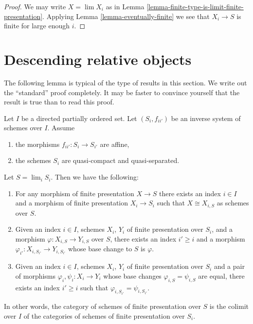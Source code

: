 \begin{proof}
We may write $X = \lim X_i$ as in
Lemma \ref{lemma-finite-type-is-limit-finite-presentation}.
Applying Lemma \ref{lemma-eventually-finite} we see that $X_i \to S$
is finite for large enough $i$.
\end{proof}








\section{Descending relative objects}
\label{section-descending-relative}

\noindent
The following lemma is typical of the type of results in this section.
We write out the ``standard'' proof completely. It may be faster to
convince yourself that the result is true than to read this proof.

\begin{lemma}
\label{lemma-descend-finite-presentation}
Let $I$ be a directed partially ordered set.
Let $(S_i, f_{ii'})$ be an inverse system of schemes over $I$.
Assume
\begin{enumerate}
\item the morphisms $f_{ii'} : S_i \to S_{i'}$ are affine,
\item the schemes $S_i$ are quasi-compact and quasi-separated.
\end{enumerate}
Let $S = \lim_i S_i$. Then we have the following:
\begin{enumerate}
\item For any morphism of finite presentation $X \to S$
there exists an index $i \in I$ and a morphism of finite
presentation $X_i \to S_i$ such that $X \cong X_{i, S}$ as
schemes over $S$.
\item Given an index $i \in I$, schemes
$X_i$, $Y_i$ of finite presentation over $S_i$, and a morphism
$\varphi : X_{i, S} \to Y_{i, S}$ over $S$, there exists an index
$i' \geq i$ and a morphism
$\varphi_{i'} : X_{i, S_{i'}} \to Y_{i, S_{i'}}$
whose base change to $S$ is $\varphi$.
\item Given an index $i \in I$, schemes $X_i$, $Y_i$ of finite presentation
over $S_i$ and a pair of morphisms $\varphi_i, \psi_i : X_i \to Y_i$
whose base changes $\varphi_{i, S} = \psi_{i, S}$ are equal,
there exists an index $i' \geq i$ such that
$\varphi_{i, S_{i'}} = \psi_{i, S_{i'}}$.
\end{enumerate}
In other words, the category of schemes of finite presentation over
$S$ is the colimit over $I$ of the categories of schemes of finite
presentation over $S_i$.
\end{lemma}

